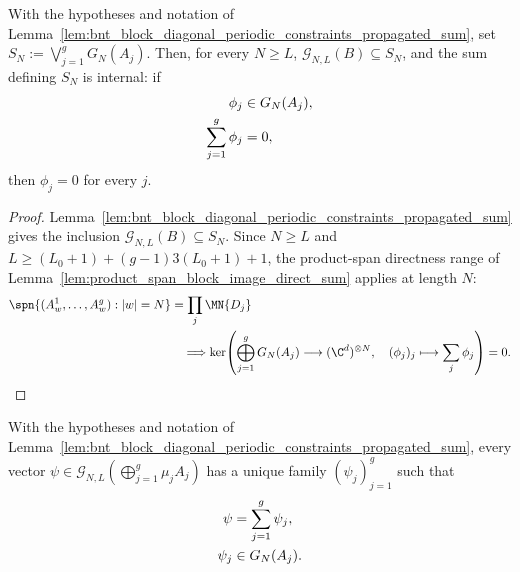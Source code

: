 \begin{lemma}
    \label{lem:bnt_block_diagonal_periodic_constraints_internal_sum}
    \leanok
    With the hypotheses and notation of
    Lemma~\ref{lem:bnt_block_diagonal_periodic_constraints_propagated_sum}, set
    $S_N:=\bigvee_{j=1}^gG_N(A_j)$. Then, for every $N\ge L$,
    $\mathcal G_{N,L}(B)\subseteq S_N$, and the sum defining $S_N$ is internal:
    if
    \begin{align}
        \phi_j             & \in G_N(A_j),
        \notag                             \\
        \sum_{j=1}^g\phi_j & =0,
        \notag
    \end{align}
    then $\phi_j=0$ for every $j$.
\end{lemma}

\begin{proof}
    \leanok
    Lemma~\ref{lem:bnt_block_diagonal_periodic_constraints_propagated_sum}
    gives the inclusion $\mathcal G_{N,L}(B)\subseteq S_N$.
    Since $N\ge L$ and
    $L\ge (L_0+1)+(g-1)3(L_0+1)+1$, the product-span directness range of
    Lemma~\ref{lem:product_span_block_image_direct_sum} applies at length $N$:
    \begin{align}
        \spn\{(A^1_w,\ldots,A^g_w):|w|=N\}
         & =\prod_j \MN{D_j}
        \notag                  \\
         & \quad\Longrightarrow
        \ker\!\left(\bigoplus_{j=1}^g G_N(A_j)
        \longrightarrow(\C^d)^{\otimes N},
        \quad
        (\phi_j)_j\longmapsto\sum_j\phi_j\right)=0.
        \notag
    \end{align}
\end{proof}

\begin{lemma}
    \label{lem:bnt_block_diagonal_open_boundary_decomposition}
    \leanok
    With the hypotheses and notation of
    Lemma~\ref{lem:bnt_block_diagonal_periodic_constraints_propagated_sum},
    every vector
    $\psi\in\mathcal G_{N,L}(\bigoplus_{j=1}^g\mu_jA_j)$ has a unique family
    $(\psi_j)_{j=1}^g$ such that
    \begin{align}
        \psi   & =\sum_{j=1}^g\psi_j,
        \notag                        \\
        \psi_j & \in G_N(A_j).
        \notag
    \end{align}
\end{lemma}

